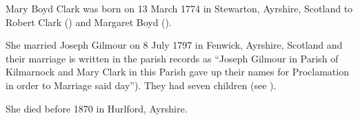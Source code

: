 
Mary Boyd Clark was born on 13 March 1774 in Stewarton, Ayrshire, Scotland to Robert Clark () and Margaret Boyd ().

She married Joseph Gilmour on 8 July 1797 in Fenwick, Ayrshire, Scotland \cite{MBClarkMarriage} and their marriage is written in the parish records as ``Joseph Gilmour in Parish of Kilmarnock and Mary Clark in this Parish gave up their names for Proclamation in order to Marriage said day''). They had seven children (see ).

She died before 1870 in Hurlford, Ayrshire.\cite{JosephGilmourDeath}

